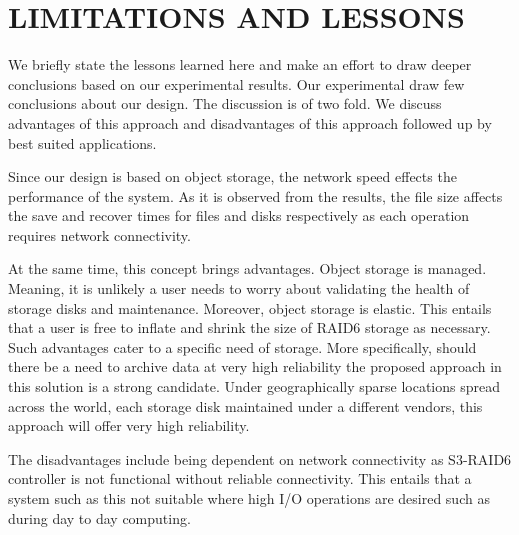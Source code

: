 \section{LIMITATIONS AND LESSONS}
\label{sec:lessons}

We briefly state the lessons learned here and make an effort to draw deeper conclusions based on our experimental results.
Our experimental draw few conclusions about our design.
The discussion is of two fold.
We discuss advantages of this approach and disadvantages of this approach followed up by best suited applications.

Since our design is based on object storage, the network speed effects the performance of the system.
As it is observed from the results, the file size affects the save and recover times for files and disks respectively as each operation requires network connectivity.

At the same time, this concept brings advantages.
Object storage is managed.
Meaning, it is unlikely a user needs to worry about validating the health of storage disks and maintenance.
Moreover, object storage is elastic.
This entails that a user is free to inflate and shrink the size of RAID6 storage as necessary.
Such advantages cater to a specific need of storage.
More specifically, should there be a need to archive data at very high reliability the proposed approach in this solution is a strong candidate.
Under geographically sparse locations spread across the world, each storage disk maintained under a different vendors, this approach will offer very high reliability.

The disadvantages include being dependent on network connectivity as S3-RAID6 controller is not functional without reliable connectivity.
This entails that a system such as this not suitable where high I/O operations are desired such as during day to day computing.

